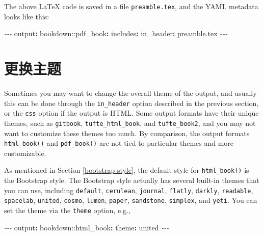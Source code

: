 \documentclass[
  12pt,
]{krantz}
\newenvironment{Shaded}{\begin{snugshade}}{\end{snugshade}}
\newcommand{\AttributeTok}[1]{\textcolor[rgb]{0.77,0.63,0.00}{#1}}
\newcommand{\FunctionTok}[1]{\textcolor[rgb]{0.00,0.00,0.00}{#1}}
\newcommand{\KeywordTok}[1]{\textcolor[rgb]{0.13,0.29,0.53}{\textbf{#1}}}
\newcommand{\PreprocessorTok}[1]{\textcolor[rgb]{0.56,0.35,0.01}{\textit{#1}}}
\theoremstyle{definition}
\theoremstyle{definition}
\theoremstyle{definition}
\theoremstyle{definition}
\theoremstyle{remark}
\begin{document}
The above LaTeX code is saved in a file \texttt{preamble.tex}, and the YAML metadata looks like this:

\begin{Shaded}
\begin{Highlighting}[]
\PreprocessorTok{{-}{-}{-}}
\FunctionTok{output}\KeywordTok{:}
\AttributeTok{  bookdown:}\FunctionTok{:pdf\_book}\KeywordTok{:}
\AttributeTok{    }\FunctionTok{includes}\KeywordTok{:}
\AttributeTok{      }\FunctionTok{in\_header}\KeywordTok{:}\AttributeTok{ preamble.tex}
\PreprocessorTok{{-}{-}{-}}
\end{Highlighting}
\end{Shaded}

\hypertarget{ux66f4ux6362ux4e3bux9898}{%
\section{更换主题}\label{ux66f4ux6362ux4e3bux9898}}

Sometimes you may want to change the overall theme of the output, and usually this can be done through the \texttt{in\_header} option described in the previous section, or the \texttt{css} option if the output is HTML. Some output formats have their unique themes, such as \texttt{gitbook}, \texttt{tufte\_html\_book}, and \texttt{tufte\_book2}, and you may not want to customize these themes too much. By comparison, the output formats \texttt{html\_book()} and \texttt{pdf\_book()} are not tied to particular themes and more customizable.

As mentioned in Section \ref{bootstrap-style}, the default style for \texttt{html\_book()} is the Bootstrap style. The Bootstrap style actually has several built-in themes that you can use, including \texttt{default}, \texttt{cerulean}, \texttt{journal}, \texttt{flatly}, \texttt{darkly}, \texttt{readable}, \texttt{spacelab}, \texttt{united}, \texttt{cosmo}, \texttt{lumen}, \texttt{paper}, \texttt{sandstone}, \texttt{simplex}, and \texttt{yeti}. You can set the theme via the \texttt{theme} option, e.g.,

\begin{Shaded}
\begin{Highlighting}[]
\PreprocessorTok{{-}{-}{-}}
\FunctionTok{output}\KeywordTok{:}
\AttributeTok{  bookdown:}\FunctionTok{:html\_book}\KeywordTok{:}
\AttributeTok{    }\FunctionTok{theme}\KeywordTok{:}\AttributeTok{ united}
\PreprocessorTok{{-}{-}{-}}
\end{Highlighting}
\end{Shaded}
\end{document}
